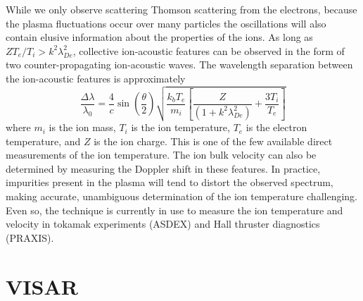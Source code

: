 \documentclass{jpp}
\begin{document}
While we only observe scattering Thomson scattering from the electrons, because the plasma fluctuations occur over many particles the oscillations will also contain elusive information about the properties of the ions. As long as $Z T_e / T_i > k^2 \lambda _{De} ^2$, collective ion-acoustic features can be observed in the form of two  counter-propagating ion-acoustic waves. The wavelength separation between the ion-acoustic features is approximately
\begin{equation*}
\frac{\Delta \lambda}{\lambda_0} = \frac{4}{c} \sin \left( \frac{\theta}{2} \right) \sqrt{ \frac{ k_b T_e}{m_i} \left[ \frac{Z}{(1 + k ^2 \lambda_{De} ^2)} + \frac{3 T_i}{T_e}\right]}
\end{equation*}
where $m_i$ is the ion mass, $T_i$ is the ion temperature, $T_e$ is the electron temperature, and $Z$ is the ion charge. This is one of the few available direct measurements of the ion temperature. The ion bulk velocity can also be determined by measuring the Doppler shift in these features. In practice, impurities present in the plasma will tend to distort the observed spectrum, making accurate, unambiguous determination of the ion temperature challenging. Even so, the technique is currently in use to measure the ion temperature and velocity in tokamak experiments (ASDEX) and Hall thruster diagnostics (PRAXIS).

\section{VISAR}
\end{document}
